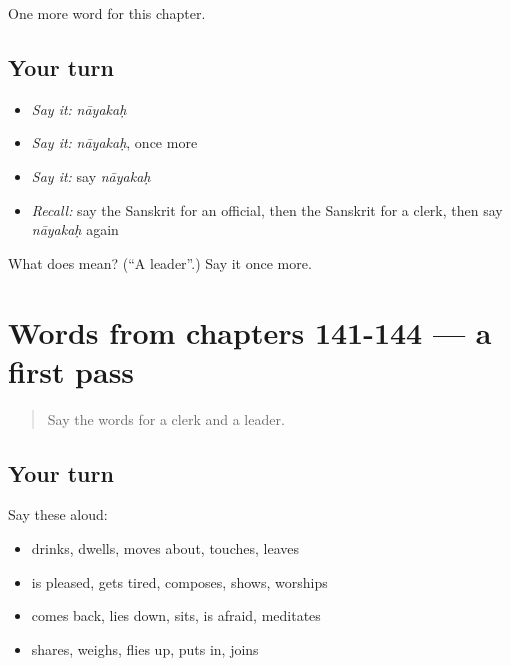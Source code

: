 \begin{grammarlens}[title={What you've built}]
One more word for this chapter.
\end{grammarlens}

\subsection*{Your turn}
\begin{itemize}
\raggedright
  \item \emph{Say it:} \emph{nāyakaḥ}
  \item \emph{Say it:} \emph{nāyakaḥ}, once more
  \item \emph{Say it:} say \emph{nāyakaḥ}
  \item \emph{Recall:} say the Sanskrit for an official, then the Sanskrit for a clerk, then say \emph{nāyakaḥ} again
\end{itemize}

\begin{tcolorbox}[breakable,colback=teal!4,colframe=teal!35!black,title={Before you move on}]
What does  mean? (\textquotedblleft{}A leader\textquotedblright{}.) Say it once more.
\end{tcolorbox}
\section[(dialogue)]{Words from chapters 141-144 — a first pass}

\label{lesson:SA-R149-first-pass-words-from-chapters-141-144}



\begin{quote}
Say the words for a clerk and a leader.
\end{quote}

\subsection*{Your turn}
Say these aloud:

\begin{itemize}
\raggedright
  \item drinks, dwells, moves about, touches, leaves
  \item is pleased, gets tired, composes, shows, worships
  \item comes back, lies down, sits, is afraid, meditates
  \item shares, weighs, flies up, puts in, joins
\end{itemize}

